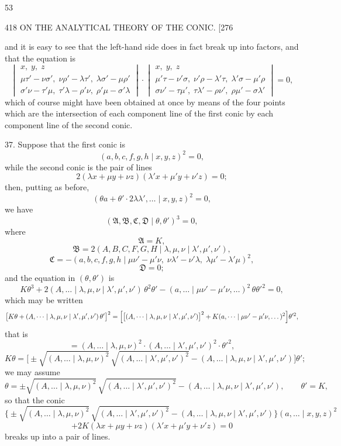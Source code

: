 \documentclass[11pt]{article}
\begin{document}
\hfill 53

\begin{center}
418 \hfill ON THE ANALYTICAL THEORY OF THE CONIC. \hfill \textsc{[276}
\end{center}

and it is easy to see that the left-hand side does in fact break up into factors, and
that the equation is
\[ \begin{vmatrix}
x,\;y,\;z\\
\mu\tau'-\nu\sigma',\;\nu\rho'-\lambda\tau',\;\lambda\sigma'-\mu\rho'\\
\sigma'\nu-\tau'\mu,\;\tau'\lambda-\rho'\nu,\;\rho'\mu-\sigma'\lambda
\end{vmatrix}
\cdot
\begin{vmatrix}
x,\;y,\;z\\
\mu'\tau-\nu'\sigma,\;\nu'\rho-\lambda'\tau,\;\lambda'\sigma-\mu'\rho\\
\sigma\nu'-\tau\mu',\;\tau\lambda'-\rho\nu',\;\rho\mu'-\sigma\lambda'
\end{vmatrix}=0, \]
which of course might have been obtained at once by means of the four points which
are the intersection of each component line of the first conic by each component line
of the second conic.

\textsc{37.} Suppose that the first conic is
\[ (a,b,c,f,g,h \mid x,y,z)^{2}=0, \]
while the second conic is the pair of lines
\[ 2(\lambda x+\mu y+\nu z)(\lambda' x+\mu' y+\nu' z)=0; \]
then, putting as before,
\[ (\theta a+\theta'\cdot 2\lambda\lambda',\dots \mid x,y,z)^{2}=0, \]
we have
\[ (\mathfrak{A},\mathfrak{B},\mathfrak{C},\mathfrak{D} \mid \theta,\theta')^{3}=0, \]
where
\[ \mathfrak{A}=K, \]
\[ \mathfrak{B}=2(A,B,C,F,G,H \mid \lambda,\mu,\nu \mid \lambda',\mu',\nu'), \]
\[ \mathfrak{C}=-(a,b,c,f,g,h \mid \mu\nu'-\mu'\nu,\;\nu\lambda'-\nu'\lambda,\;\lambda\mu'-\lambda'\mu)^{2}, \]
\[ \mathfrak{D}=0; \]
and the equation in $(\theta,\theta')$ is
\[ K\theta^{3}+2(A,\dots \mid \lambda,\mu,\nu \mid \lambda',\mu',\nu')\,\theta^{2}\theta'-(a,\dots \mid \mu\nu'-\mu'\nu,\dots)^{2}\,\theta\theta'^{2}=0, \]
which may be written
\[ \bigl[K\theta+(A,\dots \mid \lambda,\mu,\nu \mid \lambda',\mu',\nu')\,\theta'\bigr]^{2}=\Bigl[\bigl[(A,\dots \mid \lambda,\mu,\nu \mid \lambda',\mu',\nu')\bigr]^{2}+K(a,\dots \mid \mu\nu'-\mu'\nu,\dots)^{2}\Bigr]\theta'^{2}, \]
that is
\[ =(A,\dots \mid \lambda,\mu,\nu)^{2}\cdot(A,\dots \mid \lambda',\mu',\nu')^{2}\cdot\theta'^{2}, \]
\[ K\theta=\bigl[\pm\sqrt{(A,\dots \mid \lambda,\mu,\nu)^{2}}\,\sqrt{(A,\dots \mid \lambda',\mu',\nu')^{2}}-(A,\dots \mid \lambda,\mu,\nu \mid \lambda',\mu',\nu')\bigr]\theta'; \]
we may assume
\[ \theta=\pm\sqrt{(A,\dots \mid \lambda,\mu,\nu)^{2}}\,\sqrt{(A,\dots \mid \lambda',\mu',\nu')^{2}}-(A,\dots \mid \lambda,\mu,\nu \mid \lambda',\mu',\nu'),\qquad \theta'=K, \]
so that the conic
\[ \bigl\{\pm\sqrt{(A,\dots \mid \lambda,\mu,\nu)^{2}}\,\sqrt{(A,\dots \mid \lambda',\mu',\nu')^{2}}-(A,\dots \mid \lambda,\mu,\nu \mid \lambda',\mu',\nu')\bigr\}(a,\dots \mid x,y,z)^{2} \]
\[ +2K(\lambda x+\mu y+\nu z)(\lambda' x+\mu' y+\nu' z)=0 \]
breaks up into a pair of lines.
\end{document}
